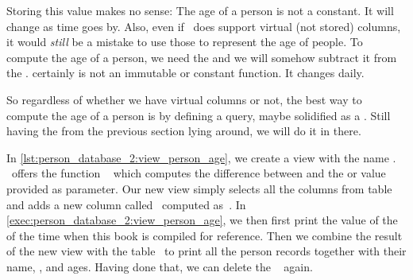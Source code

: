 Storing this value makes no sense:
The age of a person is not a constant.
It will change as time goes by.
Also, even if \postgresql\ does support virtual (not stored)  columns, it would \emph{still} be a mistake to use those to represent the age of people.%
%
%
%
To compute the age of a person, we need the  and we will somehow subtract it from the .
 certainly is not an immutable or constant function.
It changes daily.
%
%
%
%
%

So regardless of whether we have virtual  columns or not, the best way to compute the age of a person is by defining a query, maybe solidified as a .
Still having the  from the previous section lying around, we will do it in there.

In \cref{lst:person_database_2:view_person_age}, we create a view with the name .
\postgresql\ offers the function ~\cite{PGDG:PD:DTFAO} which computes the difference between  and the  or  value provided as parameter.
Our new view simply selects all the columns from table~ and adds a new column called~ computed as~.
In \cref{exec:person_database_2:view_person_age}, we then first print the value of the  of the time when this book is compiled for reference.
Then we combine the result of the new view  with the table~ to print all the person records together with their name, , and ages.
Having done that, we can delete the \db\  again.%
%
\endhsection%
%
